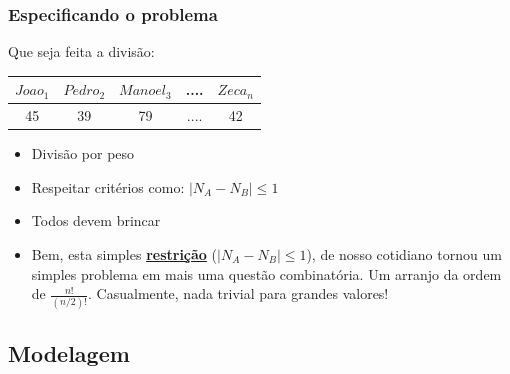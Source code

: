 \documentclass{beamer}
\begin{document}

\begin{frame}[fragile]%
\frametitle{Especificando o problema}

\begin{block}{Que seja feita a divisão:}
 
\begin{center}
\begin{tabular}{|c|c|c|c|c|}
\hline
$Joao_1$ & $Pedro_2$ & $Manoel_3$ & .... & $Zeca_n$ \\ \hline
45 & 39 & 79 & .... & 42  \\ \hline
\end{tabular}
\end{center}

\begin{itemize}
\item Divisão  por peso
\item Respeitar  critérios como: $|N_A - N_B| \le 1$
\item Todos devem brincar

\item \textsf{Bem, esta simples {\bf \underline{restrição}} ({\bf $|N_A - N_B| \le 1$}), de nosso cotidiano tornou um simples problema em mais uma questão combinatória.
 Um arranjo da ordem de  $\frac{n!}{(n/2)!}$.
 Casualmente, nada trivial  para grandes valores! }
 \end{itemize}
 
\end{block}
\end{frame}


\subsection{Modelagem}
\end{document}
